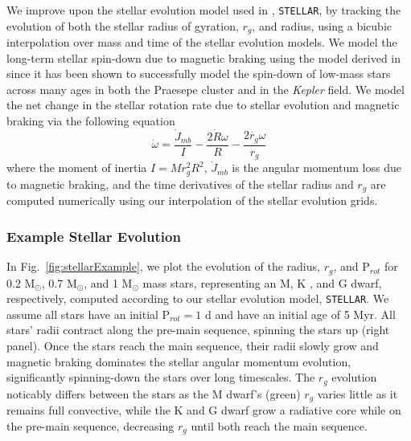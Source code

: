 \documentclass[twocolumn]{aastex61}
\newcommand{\stellar}[0]{\texttt{STELLAR}\xspace}
\newcommand{\kepler}[0]{\textit{Kepler}\xspace}
\begin{document}
We improve upon the stellar evolution model used in \citet{Fleming2018}, \stellar, by tracking the evolution of both the stellar radius of gyration, $r_g$, and radius, using a bicubic interpolation over mass and time of the \citet{Baraffe2015} stellar evolution models. We model the long-term stellar spin-down due to magnetic braking using the model derived in \citet{Matt2015} since it has been shown to successfully model the spin-down of low-mass stars across many ages in both the Praesepe cluster and in the \kepler field. We model the net change in the stellar rotation rate due to stellar evolution and magnetic braking via the following equation 
\begin{equation} \label{eqn:stellar_rot_rate_dt}
\dot{\omega} = \frac{\dot{J}_{mb}}{I} - \frac{2 \dot{R} \omega}{R} - \frac{2 \dot{r_g} \omega}{r_g}
\end{equation}
where the moment of inertia $I = M r_g^2 R^2$, $\dot{J}_{mb}$ is the angular momentum loss due to magnetic braking, and the time derivatives of the stellar radius and $r_g$ are computed numerically using our interpolation of the \citet{Baraffe2015} stellar evolution grids.  

\subsubsection{Example Stellar Evolution} \label{sec:methods:stellarExample}

In Fig.~\ref{fig:stellarExample}, we plot the evolution of the radius, $r_g$, and P$_{rot}$ for 0.2 M$_{\odot}$, 0.7 M$_{\odot}$, and 1 M$_{\odot}$ mass stars, representing an M, K , and G dwarf, respectively, computed according to our stellar evolution model, \stellar. We assume all stars have an initial P$_{rot} = 1$ d and have an initial age of 5 Myr. All stars' radii contract along the pre-main sequence, spinning the stars up (right panel). Once the stars reach the main sequence, their radii slowly grow and magnetic braking dominates the stellar angular momentum evolution, significantly spinning-down the stars over long timescales. The $r_g$ evolution noticably differs between the stars as the M dwarf's (green) $r_g$ varies little as it remains full convective, while the K and G dwarf grow a radiative core while on the pre-main sequence, decreasing $r_g$ until both reach the main sequence.
\end{document}
